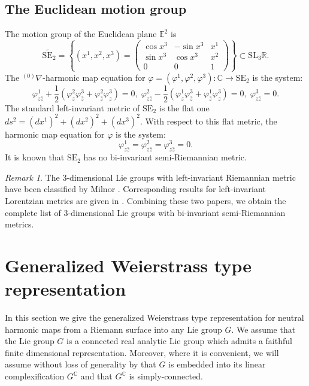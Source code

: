 \documentclass[12pt]{amsart}
\theoremstyle{definition}
\theoremstyle{remark}
\newtheorem{Remark}[Theorem]{Remark}
\numberwithin{equation}{section}
\begin{document}
\subsection{The Euclidean motion group}
 The motion group of the Euclidean plane $\mathbb{E}^2$ is 
\begin{equation*}
\widetilde{\mathrm{SE}_2}=
\left\{ (x^1, x^2, x^3) =
\left(
\begin{array}{ccc}
\cos x^3& -\sin x^3& x^1\\
\sin x^3& \cos x^3& x^2\\
0 & 0 & 1 
\end{array}
\right)
\right\}
\subset
\mathrm{SL}_{3}\mathbb{R}. 
\end{equation*}
 The ${{}^{(0)}\nabla}$-harmonic map equation for 
 $\varphi=(\varphi^1,\varphi^2,\varphi^3):\mathbb{C}\to \mathrm{SE}_2$ 
 is the system: 
\begin{equation}\label{eq:SE2}
 \varphi^1_{z\bar z}+\frac{1}{2}(\varphi^2_{z}\varphi^3_{\bar z}+\varphi^2_{\bar z}\varphi^3_z)=0,\;
\varphi^2_{z\bar z}-\frac{1}{2}(\varphi^1_{z}\varphi^3_{\bar z}+\varphi^1_{\bar z}\varphi^3_z)=0,\;
 \varphi^3_{z\bar z}=0.
\end{equation}
 The standard left-invariant metric of $\mathrm{SE}_2$ is the flat one 
 $ds^2 = (dx^1)^2+(dx^2)^2+(dx^3)^2$. With respect to this flat metric, 
 the harmonic map equation for $\varphi$ is the system:
\begin{equation*}
 \varphi^1_{z\bar z}=\varphi^2_{z\bar z}=\varphi^3_{z\bar z}=0.
\end{equation*}
 It is known that $\mathrm{SE}_2$ 
 has no bi-invariant semi-Riemannian metric.
 \begin{Remark}
 The $3$-dimensional Lie groups with  left-invariant Riemannian
 metric have been classified by Milnor \cite{Milnor}. Corresponding 
 results for left-invariant Lorentzian metrics are given in \cite{CP}. 
 Combining these two papers, we obtain the complete list of $3$-dimensional 
 Lie groups with bi-invariant semi-Riemannian metrics.
 \end{Remark}
 
\section{Generalized Weierstrass type representation} 
\label{sc:DPW}
In this section we give the generalized Weierstrass type representation
 for neutral harmonic maps from a Riemann surface into any Lie group $G$.
 We assume that the Lie group $G$
 is a connected real analytic Lie group which 
 admits a faithful finite dimensional representation. 
 Moreover, where it is convenient, we will assume without loss of generality by  
 \cite{Hochschild, Hochschild-Comp} that $G$ is embedded into its linear 
 complexification $G^{\mathbb C}$ and that $G^{\mathbb C}$ is simply-connected.
\end{document}
